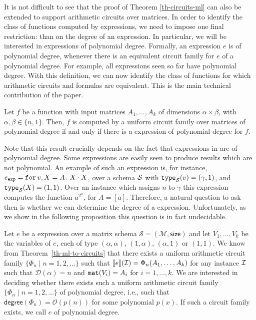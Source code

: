 

It is not difficult to see that the proof of Theorem \ref{th-circuits-ml} can also be extended to support arithmetic circuits over matrices. In order to identify the class of functions computed by \langfor expressions, we need to impose one final restriction: than on the degree of an expression. 
In particular, we will be interested in \langfor expressions of polynomial degree. Formally, an expression $e$ is of polynomial degree, whenever there is an equivalent circuit family for $e$ of a polynomial degree.  
For example, all \langfor expressions seen so far have polynomial degree.
With this definition, we can now identify the class of functions for which arithmetic circuits and \langfor formulas are equivalent. This is the main technical contribution of the paper. 

\begin{corollary}
\label{th-equivalence}
Let $f$ be a function with input matrices $A_1,\ldots ,A_k$ of dimensions $\alpha\times \beta$, with $\alpha,\beta \in \{n,1\}$. Then, $f$ is computed by a uniform circuit family over matrices of polynomial degree if and only if there is a \langfor expression of polynomial degree for $f$. 
\end{corollary}

Note that this result crucially depends on the fact that expressions in \langfor are of polynomial degree.
Some \langfor expressions are easily seen to produce results which are not polynomial.
An example of such an expression is, for instance, $e_{\texttt{exp}} = \texttt{for}\, v,X=A \texttt{.}\, X\cdot X$, over a schema $\mathcal{S}$ with $\texttt{type}_{\mathcal{S}}(v)= (\gamma,1)$, and $\texttt{type}_{\mathcal{S}}(X)=(1,1)$.
Over an instance which assigns $n$ to $\gamma$ this expression computes the function $a^{2^n}$, for $A=[a]$.
Therefore, a natural question to ask then is whether we can determine the degree of a \langfor expression.
Unfortunately, as we show in the following proposition this question is in fact undecidable.

Let $e$ be a \langfor expression over a matrix schema $\mathcal{S}=(\mathcal{M},\textsf{size})$ and let $V_1,\ldots, V_k$ be
the variables of $e$, each of type $(\alpha,\alpha)$, $(1,\alpha)$, $(\alpha,1)$ or $(1,1)$. We know from Theorem~\ref{th-ml-to-circuits}
that there exists a uniform arithmetic circuit family $\{\Phi_n \mid n=1,2,\ldots\}$
such that $\llbracket e \rrbracket(\mathcal{I})=\Phi_n(A_1,\ldots,A_k)$ for any instance $\mathcal{I}$ such that
$\mathcal{D}(\alpha)=n$ and $\texttt{mat}(V_i)=A_i$ for $i=1,\ldots,k$. We are interested in deciding
whether there exists such a  uniform arithmetic circuit family $\{\Phi_n \mid n=1,2,\ldots\}$
of polynomial degree, i.e., such that $\mathsf{degree}(\Phi_n)=\mathcal{O}(p(n))$ for some polynomial $p(x)$. If such a circuit family exists, we call $e$ of polynomial degree.

